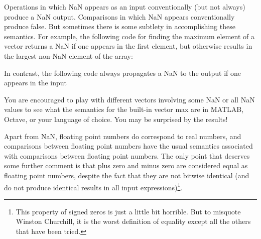 Operations in which NaN appears as an input conventionally (but not always)
produce a NaN output.  Comparisons in which NaN appears conventionally produce false.
But sometimes there is some subtlety in accomplishing these
semantics.  For example, the following code for finding the maximum
element of a vector returns a NaN if one appears
in the first element, but otherwise results in the largest non-NaN
element of the array:

In contrast, the following code always propagates a NaN to the output
if one appears in the input

You are encouraged to play with different vectors involving some NaN
or all NaN values to see what the semantics for the built-in
vector max are in MATLAB, Octave, or your language of choice.
You may be surprised by the results!

Apart from NaN, floating point numbers do correspond to real numbers,
and comparisons between floating point numbers have the usual semantics
associated with comparisons between floating point numbers.  The only
point that deserves some further comment is that plus zero and minus
zero are considered equal as floating point numbers, despite the fact
that they are not bitwise identical (and do not produce identical
results in all input expressions)\footnote{%
This property of signed zeros is just a little bit horrible.
But to misquote Winston Churchill, it is the worst
definition of equality except all the others that have been tried.
}.
